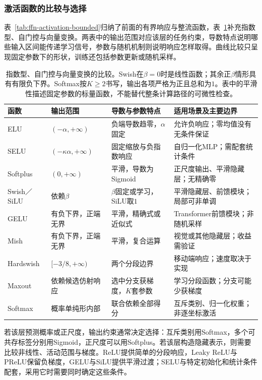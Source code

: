 \subsubsection{激活函数的比较与选择}
\label{sec:ffn-activation-selection}

表~\ref{tab:ffn-activation-bounded}归纳了前面的有界响应与整流函数，表~\ref{tab:ffn-activation-smooth}补充指数型、自门控与向量变换。两表中的输出范围对应该层的任务约束，导数特点说明哪些输入区间能传递学习信号，参数与随机机制则说明响应怎样取得。曲线比较只呈现固定参数下的形状，训练还包括参数更新或随机采样。



\begin{table}[htb]
  \centering
  \small
  \begin{tabularx}{\linewidth}{@{}l l X X@{}}
    \toprule
    函数 & 输出范围 & 导数与参数特点 & 适用场景及主要边界 \\
    \midrule
    ELU & $(-\alpha,+\infty)$ & 负端导数趋零，$\alpha$固定 & 允许负响应；零均值没有无条件保证 \\
    SELU & $(-\kappa\alpha,+\infty)$ & 固定缩放与负指数响应 & 自归一化MLP；需配套统计条件 \\
    Softplus & $(0,+\infty)$ & 平滑，导数为Sigmoid & 正尺度输出、平滑隐藏层；无精确零 \\
    Swish／SiLU & 依赖$\beta$ & $\beta$固定或学习，SiLU取$1$ & 平滑隐藏层、前馈模块；局部可非单调 \\
    GELU & 有负下界，正端无界 & 平滑，精确式或近似式 & Transformer前馈模块；非随机采样 \\
    Mish & 有负下界，正端无界 & 平滑，复合运算 & 视觉或其他隐藏层；收益需验证 \\
    Hardswish & $[-3/8,+\infty)$ & 两个分段边界 & 移动端响应；速度取决于实现 \\
    Maxout & 依赖候选仿射响应 & 选中分支获梯度，$K$套参数 & 学习分段函数；分支可能少获梯度 \\
    Softmax & 概率单纯形内部 & 联合依赖全部得分 & 互斥类别、归一化权重；非逐坐标激活 \\
    \bottomrule
  \end{tabularx}
  \caption{指数型、自门控与向量变换的比较。Swish在$\beta=0$时是线性函数；其余正$\beta$情形具有有限负下界。Softmax按$K\geq2$书写，输出各项严格为正且总和为$1$。表中的平滑性描述固定参数的标量函数，不能替代整条计算路径的可微性检查。}
  \label{tab:ffn-activation-smooth}
\end{table}

若该层预测概率或正尺度，输出约束通常决定选择：互斥类别用Softmax，多个可共存标签分别用Sigmoid，正尺度可以用Softplus。若该层构造隐藏表示，则需要比较非线性、活动范围与梯度。ReLU提供简单的分段响应，Leaky ReLU与PReLU保留负梯度，GELU与SiLU提供平滑过渡；SELU与特定初始化和统计条件配套，采用它时需要同时确定这些条件。

